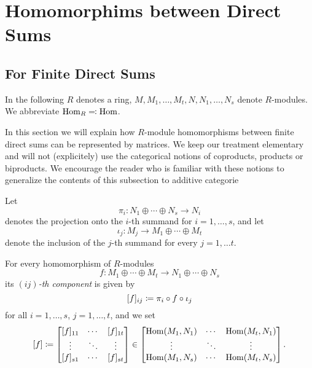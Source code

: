 \section{Homomorphims between Direct Sums}
\label{appendix: homomorphisms between direct sums}





\subsection{For Finite Direct Sums}


\begin{conventions}
  In the following $R$ denotes a ring, $M, M_1, \dotsc, M_t, N, N_1, \dotsc, N_s$ denote $R$-modules.
  We abbreviate $\operatorname{Hom}_R \eqqcolon \operatorname{Hom}$.
\end{conventions}


\begin{fluff}
  In this section we will explain how $R$-module homomorphisms between finite direct sums can be represented  by matrices.
  We keep our treatment elementary and will not (explicitely) use the categorical notions of coproducts, products or biproducts.
  We encourage the reader who is familiar with these notions to generalize the contents of this subsection to additive categorie
\end{fluff}


\begin{fluff}
  Let
  \[
          \pi_i
  \colon  N_1 \oplus \dotsb \oplus N_s
  \to     N_i
  \]
  denotes the projection onto the $i$-th summand for $i = 1, \dotsc, s$, and let
  \[
            \iota_j
    \colon  M_j
    \to     M_1 \oplus \dotsb \oplus M_t
  \]
  denote the inclusion of the $j$-th summand for every $j = 1, \dotsc t$.
\end{fluff}


\begin{definition}
  For every homomorphism of $R$-modules
  \[
            f
    \colon  M_1 \oplus \dotsb \oplus M_t
    \to     N_1 \oplus \dotsb \oplus N_s
  \]
  its \emph{$(ij)$-th component} is given by
  \[
              [f]_{ij}
    \coloneqq  \pi_i \circ f \circ \iota_j
  \]
  for all $i = 1, \dotsc, s$, $j = 1, \dotsc, t$, and we set
  \[
              [f]
    \coloneqq  \begin{bmatrix}
                [f]_{11}  & \cdots  & [f]_{1t}  \\
                \vdots    & \ddots  & \vdots    \\
                [f]_{s1}  & \cdots  & [f]_{st}
              \end{bmatrix}
    \in       \begin{bmatrix}
                \operatorname{Hom}(M_1, N_1)  & \cdots  & \operatorname{Hom}(M_t, N_1)  \\
                \vdots          & \ddots  & \vdots          \\
                \operatorname{Hom}(M_1, N_s)  & \cdots  & \operatorname{Hom}(M_t, N_s)
              \end{bmatrix}.
  \]
\end{definition}


